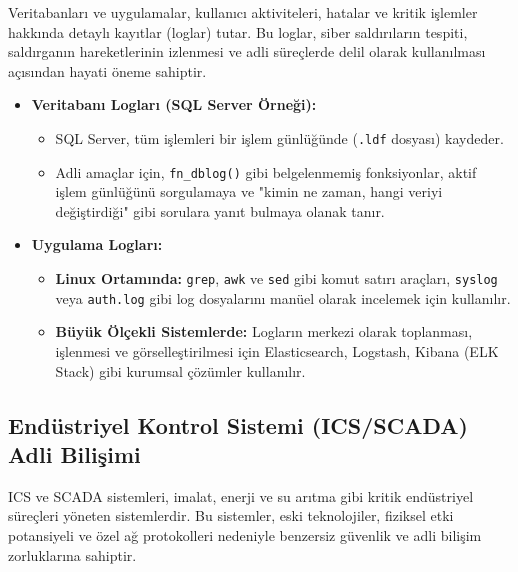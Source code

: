 \begin{itemize}
Veritabanları ve uygulamalar, kullanıcı aktiviteleri, hatalar ve kritik işlemler hakkında detaylı kayıtlar (loglar) tutar. Bu loglar, siber saldırıların tespiti, saldırganın hareketlerinin izlenmesi ve adli süreçlerde delil olarak kullanılması açısından hayati öneme sahiptir.

\begin{itemize}
    \item \textbf{Veritabanı Logları (SQL Server Örneği):}
    \begin{itemize}
        \item SQL Server, tüm işlemleri bir işlem günlüğünde (\texttt{.ldf} dosyası) kaydeder.
        \item Adli amaçlar için, \texttt{fn\_dblog()} gibi belgelenmemiş fonksiyonlar, aktif işlem günlüğünü sorgulamaya ve "kimin ne zaman, hangi veriyi değiştirdiği" gibi sorulara yanıt bulmaya olanak tanır.
    \end{itemize}
    \item \textbf{Uygulama Logları:}
    \begin{itemize}
        \item \textbf{Linux Ortamında:} \texttt{grep}, \texttt{awk} ve \texttt{sed} gibi komut satırı araçları, \texttt{syslog} veya \texttt{auth.log} gibi log dosyalarını manüel olarak incelemek için kullanılır.
        \item \textbf{Büyük Ölçekli Sistemlerde:} Logların merkezi olarak toplanması, işlenmesi ve görselleştirilmesi için Elasticsearch, Logstash, Kibana (ELK Stack) gibi kurumsal çözümler kullanılır.
    \end{itemize}
\end{itemize}

\subsection{Endüstriyel Kontrol Sistemi (ICS/SCADA) Adli Bilişimi}

ICS ve SCADA sistemleri, imalat, enerji ve su arıtma gibi kritik endüstriyel süreçleri yöneten sistemlerdir. Bu sistemler, eski teknolojiler, fiziksel etki potansiyeli ve özel ağ protokolleri nedeniyle benzersiz güvenlik ve adli bilişim zorluklarına sahiptir.


\end{itemize}
